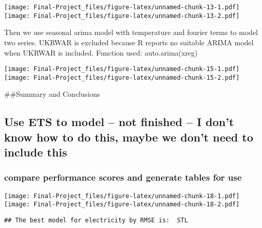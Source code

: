 \documentclass[
]{article}
\begin{document}
\texttt{[image: Final-Project\_files/figure-latex/unnamed-chunk-13-1.pdf]}
\texttt{[image: Final-Project\_files/figure-latex/unnamed-chunk-13-2.pdf]}

Then we use seasonal arima model with temperature and fourier terms to
model two series. UKRWAR is excluded because R reports no suitable ARIMA
model when UKRWAR is included. Function used: auto.arima(xreg)

\texttt{[image: Final-Project\_files/figure-latex/unnamed-chunk-15-1.pdf]}
\texttt{[image: Final-Project\_files/figure-latex/unnamed-chunk-15-2.pdf]}

\#\#Summary and Conclusions

\hypertarget{use-ets-to-model-not-finished-i-dont-know-how-to-do-this-maybe-we-dont-need-to-include-this}{%
\subsection{Use ETS to model -- not finished -- I don't know how to do
this, maybe we don't need to include
this}\label{use-ets-to-model-not-finished-i-dont-know-how-to-do-this-maybe-we-dont-need-to-include-this}}

\hypertarget{compare-performance-scores-and-generate-tables-for-use}{%
\subsubsection{compare performance scores and generate tables for
use}\label{compare-performance-scores-and-generate-tables-for-use}}

\texttt{[image: Final-Project\_files/figure-latex/unnamed-chunk-18-1.pdf]}
\texttt{[image: Final-Project\_files/figure-latex/unnamed-chunk-18-2.pdf]}

\begin{verbatim}
## The best model for electricity by RMSE is:  STL
\end{verbatim}
\end{document}
